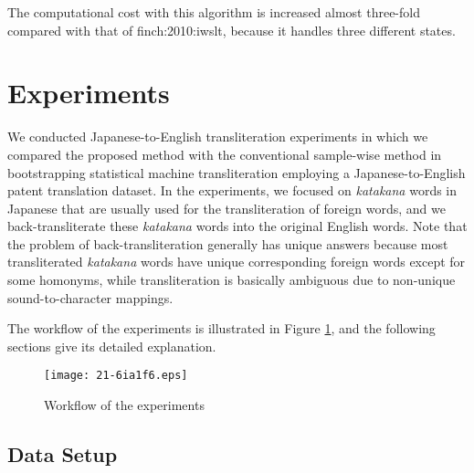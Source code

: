 \documentclass[english]{jnlp_1.4}
\newcommand{\newcite}{}
\begin{document}
The computational cost with this algorithm is increased almost three-fold compared with that of \newcite{finch:2010:iwslt},
because it handles three different states.


\section{Experiments}

We conducted Japanese-to-English transliteration experiments in which we compared the proposed method
with the conventional sample-wise method in bootstrapping statistical machine transliteration
employing a Japanese-to-English patent translation dataset.
In the experiments, we focused on {\it katakana} words in Japanese
that are usually used for the transliteration of foreign words,
and we back-transliterate these {\it katakana} words into the original English words.
Note that the problem of back-transliteration generally has unique answers
because most transliterated {\it katakana} words have unique corresponding foreign words except for some homonyms,
while transliteration is basically ambiguous due to non-unique sound-to-character mappings.

The workflow of the experiments is illustrated in Figure {\ref{fig:experiment}},
and the following sections give its detailed explanation.

\begin{figure}[t]
\begin{center}
\texttt{[image: 21-6ia1f6.eps]}
\end{center}
\caption{Workflow of the experiments}
\label{fig:experiment}
\vspace{-0.5\Cvs}
\end{figure}


\subsection{Data Setup}
\end{document}
